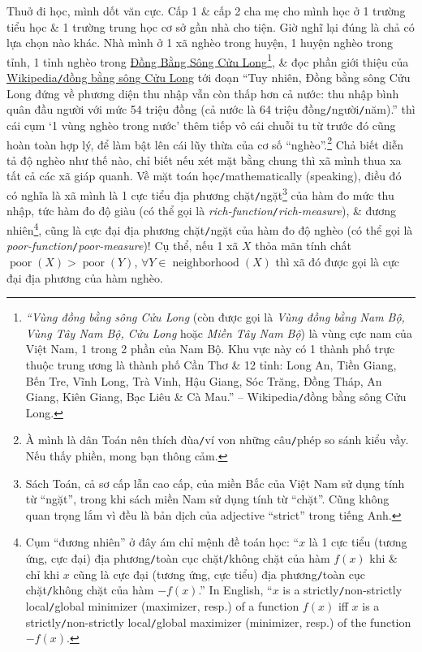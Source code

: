 \documentclass[12pt,twoside]{book}
\begin{document}
Thuở đi học, mình dốt văn cực. Cấp 1 \& cấp 2 cha mẹ cho mình học ở 1 trường tiểu học \& 1 trường trung học cơ sở gần nhà cho tiện. Giờ nghĩ lại đúng là chả có lựa chọn nào khác. Nhà mình ở 1 xã nghèo trong huyện, 1 huyện nghèo trong tỉnh, 1 tỉnh nghèo trong \href{https://vi.wikipedia.org/wiki/%C4%90%E1%BB%93ng_b%E1%BA%B1ng_s%C3%B4ng_C%E1%BB%ADu_Long}{Đồng Bằng Sông Cửu Long}\footnote{{\it``Vùng đồng bằng sông Cửu Long} (còn được gọi là {\it Vùng đồng bằng Nam Bộ, Vùng Tây Nam Bộ, Cửu Long} hoặc {\it Miền Tây Nam Bộ}) là vùng cực nam của Việt Nam, 1 trong 2 phần của Nam Bộ. Khu vực này có 1 thành phố trực thuộc trung ương là thành phố Cần Thơ \& 12 tỉnh: Long An, Tiền Giang, Bến Tre, Vĩnh Long, Trà Vinh, Hậu Giang, Sóc Trăng, Đồng Tháp, An Giang, Kiên Giang, Bạc Liêu \& Cà Mau.'' -- Wikipedia{\tt/}đồng bằng sông Cửu Long.}, \& đọc phần giới thiệu của \href{https://vi.wikipedia.org/wiki/%C4%90%E1%BB%93ng_b%E1%BA%B1ng_s%C3%B4ng_C%E1%BB%ADu_Long}{Wikipedia{\tt/}đồng bằng sông Cửu Long} tới đoạn ``Tuy nhiên, Đồng bằng sông Cửu Long đứng về phương diện thu nhập vẫn còn thấp hơn cả nước: thu nhập bình quân đầu người với mức 54 triệu đồng (cả nước là 64 triệu đồng{\tt/}người{\tt/}năm).'' thì cái cụm `1 vùng nghèo trong nước' thêm tiếp vô cái chuỗi tu từ trước đó cũng hoàn toàn hợp lý, để làm bật lên cái lũy thừa của cơ số ``nghèo''.\footnote{À mình là dân Toán nên thích đùa{\tt/}ví von những câu{\tt/}phép so sánh kiểu vầy. Nếu thấy phiền, mong bạn thông cảm.} Chả biết diễn tả độ nghèo như thế nào, chỉ biết nếu xét mặt bằng chung thì xã mình thua xa tất cả các xã giáp quanh. Về mặt toán học{\tt/}mathematically (speaking), điều đó có nghĩa là xã mình là 1 cực tiểu địa phương chặt{\tt/}ngặt\footnote{Sách Toán, cả sơ cấp lẫn cao cấp, của miền Bắc của Việt Nam sử dụng tính từ ``ngặt'', trong khi sách miền Nam sử dụng tính từ ``chặt''. Cũng không quan trọng lắm vì đều là bản dịch của adjective ``strict'' trong tiếng Anh.} của hàm đo mức thu nhập, tức hàm đo độ giàu (có thể gọi là {\it rich-function}{\tt/}{\it rich-measure}), \& đương nhiên\footnote{Cụm ``đương nhiên'' ở đây ám chỉ mệnh đề toán học: ``$x$ là 1 cực tiểu (tương ứng, cực đại) địa phương{\tt/}toàn cục chặt{\tt/}không chặt của hàm $f(x)$ khi \& chỉ khi $x$ cũng là cực đại (tương ứng, cực tiểu) địa phương{\tt/}toàn cục chặt{\tt/}không chặt của hàm $-f(x)$.'' In English, ``$x$ is a strictly{\tt/}non-strictly local{\tt/}global minimizer (maximizer, resp.) of a function $f(x)$ iff $x$ is a strictly{\tt/}non-strictly local{\tt/}global maximizer (minimizer, resp.) of the function $-f(x)$.}, cũng là cực đại địa phương chặt{\tt/}ngặt của hàm đo độ nghèo (có thể gọi là {\it poor-function}{\tt/}{\it poor-measure})! Cụ thể, nếu 1 xã $X$ thỏa mãn tính chất $\operatorname{poor}(X) > \operatorname{poor}(Y)$, $\forall Y\in\operatorname{neighborhood}(X)$ thì xã đó được gọi là cực đại địa phương của hàm nghèo.
\end{document}
